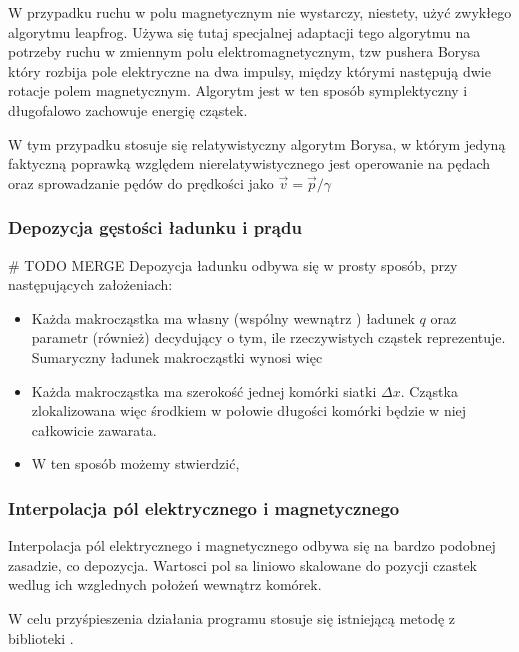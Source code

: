     W przypadku ruchu w polu magnetycznym nie wystarczy, niestety, użyć zwykłego algorytmu leapfrog. %
    Używa się tutaj specjalnej adaptacji tego algorytmu na potrzeby ruchu w zmiennym polu elektromagnetycznym,
    tzw pushera %
    Borysa %
    który rozbija pole elektryczne na dwa impulsy, między którymi następują dwie %
    rotacje polem magnetycznym. Algorytm jest w ten sposób symplektyczny %
    i długofalowo zachowuje energię cząstek.

    W tym przypadku stosuje się relatywistyczny algorytm Borysa, w którym jedyną faktyczną poprawką względem
    nierelatywistycznego jest operowanie na pędach oraz sprowadzanie pędów do prędkości jako $\vec{v} = \vec{p} / \gamma$

    \subsubsection{Depozycja gęstości ładunku i prądu} # TODO MERGE
    Depozycja ładunku odbywa się w prosty sposób, przy następujących założeniach:
    \begin{itemize}
        \item Każda makrocząstka ma własny (wspólny wewnątrz ) ładunek $q$ oraz parametr  (również) %
            decydujący o tym, ile rzeczywistych cząstek reprezentuje. Sumaryczny ładunek makrocząstki wynosi więc 
        \item Każda makrocząstka ma szerokość jednej komórki siatki $\Delta x$. Cząstka zlokalizowana więc środkiem
            w połowie długości komórki będzie w niej całkowicie zawarata.
        \item W ten sposób możemy stwierdzić, %


    \end{itemize}
    \subsubsection{Interpolacja pól elektrycznego i magnetycznego}
    Interpolacja pól elektrycznego i magnetycznego odbywa się na bardzo podobnej zasadzie, co depozycja.
    Wartosci pol sa liniowo skalowane do pozycji czastek wedlug ich wzglednych położeń wewnątrz komórek.

    W celu przyśpieszenia działania programu stosuje się istniejącą metodę
     z biblioteki . %
